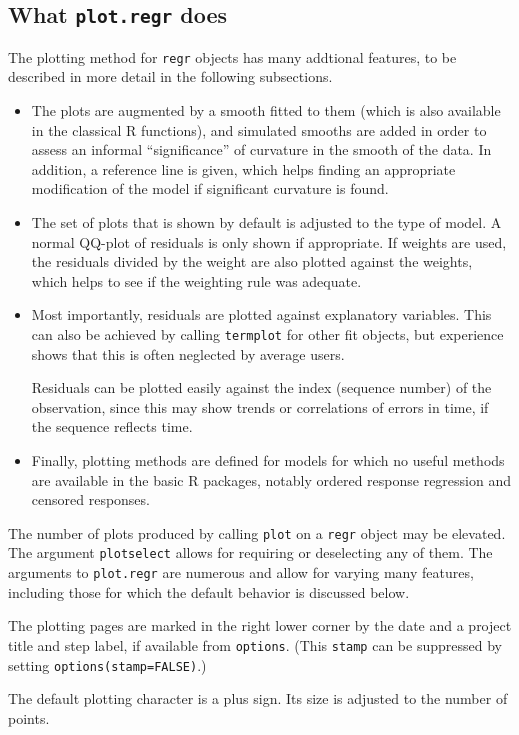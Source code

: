 \documentclass[11pt]{article}
\providecommand{\T}{\texttt}
\begin{document}
\subsection{What \T{plot.regr} does}
The plotting method for \T{regr} objects has many addtional features, to be
described in more detail in the following subsections.
\begin{itemize}
\item
The plots are augmented by a smooth fitted to them (which is also
available in the classical R functions), and simulated smooths are added in
order to assess an informal ``significance'' of curvature in the smooth of
the data. In addition, a reference line is given, which helps finding
an appropriate modification of the model if significant curvature is
found. 
\item
The set of plots that is shown by default is adjusted to the type of
model. A normal QQ-plot of residuals is only shown if appropriate.
If weights are used, the residuals divided by the weight 
are also plotted against the
weights, which helps to see if the weighting rule was adequate.
\item 
Most importantly, residuals are plotted against explanatory variables.
This can also be achieved by calling \T{termplot} for other fit objects,  
but experience shows that this is often neglected by average users.

Residuals can be plotted easily against the index (sequence
number) of the observation, since this may show trends or 
correlations of errors in time, if the sequence reflects time.
\item
Finally, plotting methods are defined for models for which no useful 
methods are available in the basic R packages, notably ordered response
regression and censored responses.
\end{itemize}

The number of plots produced by calling \T{plot} on a \T{regr} object may
be elevated. The argument \T{plotselect} allows for requiring or deselecting
any of them. 
The arguments to \T{plot.regr} are numerous and allow for varying many
features, including those for which the default behavior is discussed below.

The plotting pages are marked in the right lower corner by the date and a
project title and step label, if available from \T{options}. 
(This \T{stamp} can be suppressed by setting \T{options(stamp=FALSE)}.) 

The default plotting character is a plus sign. Its size is adjusted to
the number of points.
\end{document}
